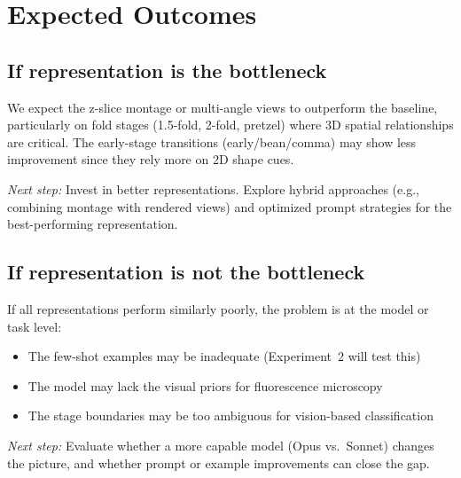 \documentclass[11pt, a4paper]{article}
\begin{document}
\section{Expected Outcomes}

\subsection{If representation is the bottleneck}

We expect the z-slice montage or multi-angle views to outperform the baseline,
particularly on fold stages (1.5-fold, 2-fold, pretzel) where 3D spatial
relationships are critical. The early-stage transitions (early/bean/comma) may
show less improvement since they rely more on 2D shape cues.

\emph{Next step:} Invest in better representations. Explore hybrid approaches
(e.g., combining montage with rendered views) and optimized prompt strategies
for the best-performing representation.

\subsection{If representation is not the bottleneck}

If all representations perform similarly poorly, the problem is at the model or
task level:
\begin{itemize}[itemsep=2pt]
  \item The few-shot examples may be inadequate (Experiment~2 will test this)
  \item The model may lack the visual priors for fluorescence microscopy
  \item The stage boundaries may be too ambiguous for vision-based classification
\end{itemize}

\emph{Next step:} Evaluate whether a more capable model (Opus vs.\ Sonnet)
changes the picture, and whether prompt or example improvements can close the
gap.
\end{document}
